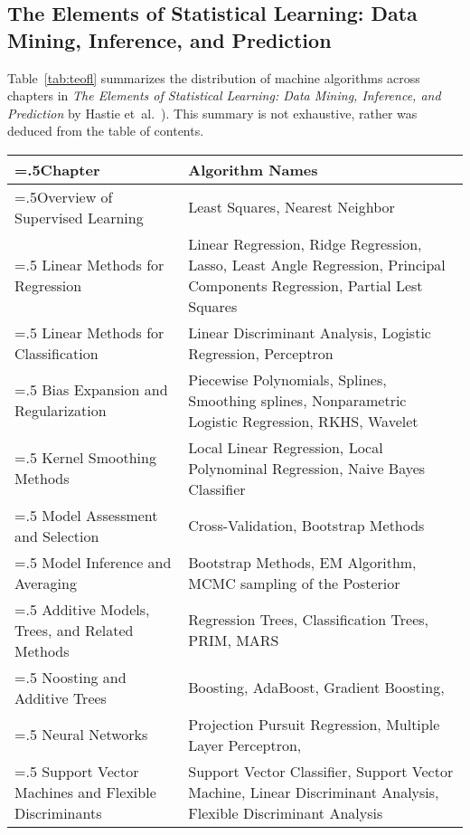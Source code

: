 \documentclass[a4paper, 11pt]{article}
\begin{document}
\subsection{The Elements of Statistical Learning: Data Mining, Inference, and Prediction}
Table~\ref{tab:teofl} summarizes the distribution of machine algorithms across chapters in \emph{The Elements of Statistical Learning: Data Mining, Inference, and Prediction} by Hastie et~al.\ \cite{Hastie2009}). This summary is not exhaustive, rather was deduced from the table of contents. 

\begin{table}[ht]
	\centering\footnotesize
		\begin{tabularx}{\textwidth}{>{\hsize=.5\hsize}XX}
		\toprule
		\textbf{Chapter} & \textbf{Algorithm Names} \\ 
		\toprule
		Overview of Supervised Learning & Least Squares, Nearest Neighbor  \\
		\midrule
		Linear Methods for Regression & Linear Regression, Ridge Regression, Lasso, Least Angle Regression, Principal Components Regression, Partial Lest Squares \\
		\midrule
		Linear Methods for Classification & Linear Discriminant Analysis, Logistic Regression, Perceptron \\
		\midrule
		Bias Expansion and Regularization & Piecewise Polynomials, Splines, Smoothing splines, Nonparametric Logistic Regression, RKHS, Wavelet \\
		\midrule
		Kernel Smoothing Methods & Local Linear Regression, Local Polynominal Regression, Naive Bayes Classifier \\
		\midrule
		Model Assessment and Selection & Cross-Validation, Bootstrap Methods \\
		\midrule
		Model Inference and Averaging & Bootstrap Methods, EM Algorithm, MCMC sampling of the Posterior \\
		\midrule		
		Additive Models, Trees, and Related Methods & Regression Trees, Classification Trees, PRIM, MARS \\
		\midrule		
		Noosting and Additive Trees & Boosting, AdaBoost, Gradient Boosting,  \\
		\midrule
		Neural Networks & Projection Pursuit Regression, Multiple Layer Perceptron,  \\
		\midrule
		Support Vector Machines and Flexible Discriminants & Support Vector Classifier, Support Vector Machine, Linear Discriminant Analysis, Flexible Discriminant Analysis \\

\end{tabularx}
\end{table}
\end{document}
